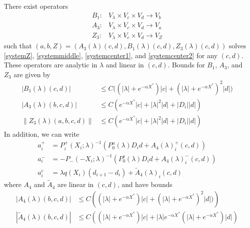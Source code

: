 \documentclass[thesis.tex]{subfiles}
\begin{document}
\begin{lemma}\label{Zinv2}
There exist operators
\begin{align*}
B_1: &V_\lambda \times V_c \times V_d \rightarrow V_b \\
A_3: &V_\lambda \times V_c \times V_d \rightarrow V_a \\
Z_3: &V_\lambda \times V_c \times V_d \rightarrow V_Z
\end{align*}
such that $( a, b, Z ) = ( A_3(\lambda)(c, d), B_1(\lambda)(c, d), Z_3(\lambda)(c, d) )$ solves \eqref{systemZ}, \eqref{systemmiddle}, \eqref{systemcenter1}, and \eqref{systemcenter2} for any $(c, d)$. These operators are analytic in $\lambda$ and linear in $(c, d)$. Bounds for $B_1$, $A_3$, and $Z_3$ are given by
\begin{align}
|B_1(\lambda)(c, d)| &\leq C\Big( (|\lambda| + e^{-\alpha X^*})|c| + (|\lambda| + e^{-\alpha X^*})^2 |d| \Big) \label{B1bound} \\
|A_3(\lambda)(b, c, d)| &\leq C \left( e^{-\alpha X^*} |c| + |\lambda|^2 |d| + |D_i||d| \right) \label{A3bound} \\
\| Z_3(\lambda)(a,b,c,d) \| &\leq C\left( e^{-\alpha X^*} |c| + |\lambda|^2|d| + |D_i||d| \right) \label{Z3bound}
\end{align} 
In addition, we can write
\begin{align*}
a_i^+ &= P_i^+(X_i; \lambda)^{-1} \left( P_0^u(\lambda) D_i d + A_4(\lambda)_i^+(c, d) \right) \\
a_i^- &= -P_-(-X_i; \lambda)^{-1} \left( P_0^s(\lambda) D_i d + A_4(\lambda)_i^-(c, d) \right) \\
a_i^c &= \lambda q(X_i)(d_{i+1} - d_i ) + \tilde{A}_4(\lambda)_i(c, d) 
\end{align*}
where $A_4$ and $\tilde{A}_4$ are linear in $(c, d)$, and have bounds
\begin{align}
|A_4(\lambda)(b, c, d)|
&\leq C \left( (|\lambda| + e^{-\alpha X^*})|c| + (|\lambda| + e^{-\alpha X^*})^2 |d| ) \right)  \label{A4bound} \\
|\tilde{A}_4(\lambda)(b, c, d)| &\leq C \left( (|\lambda| + e^{-\alpha X^*})|c| +  |\lambda| e^{-\alpha X^*} (|\lambda| + e^{-\alpha X^*}) |d| \right) \label{tildeA4bound}
\end{align}


\end{lemma}
\end{document}
